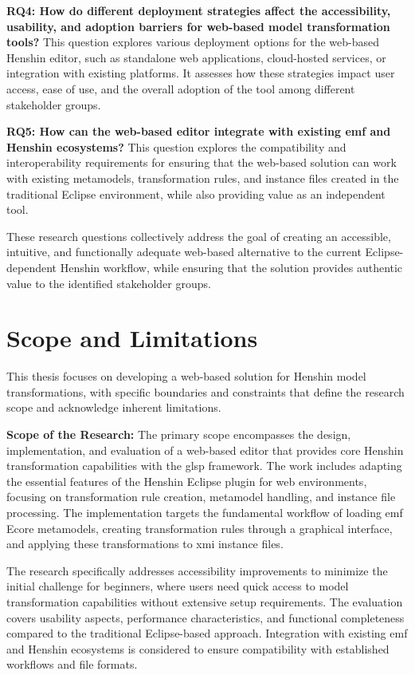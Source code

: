 \textbf{RQ4: How do different deployment strategies affect the accessibility, usability, and adoption barriers for web-based model transformation tools?}
This question explores various deployment options for the web-based Henshin editor, such as standalone web applications, cloud-hosted services, or integration with existing platforms. It assesses how these strategies impact user access, ease of use, and the overall adoption of the tool among different stakeholder groups.


\textbf{RQ5: How can the web-based editor integrate with existing \ac{emf} and Henshin ecosystems?}
This question explores the compatibility and interoperability requirements for ensuring that the web-based solution can work with existing metamodels, transformation rules, and instance files created in the traditional Eclipse environment, while also providing value as an independent tool.

These research questions collectively address the goal of creating an accessible, intuitive, and functionally adequate web-based alternative to the current Eclipse-dependent Henshin workflow, while ensuring that the solution provides authentic value to the identified stakeholder groups.

\section{Scope and Limitations}
\label{subsec:scope-limitations}

This thesis focuses on developing a web-based solution for Henshin model transformations, with specific boundaries and constraints that define the research scope and acknowledge inherent limitations.

\textbf{Scope of the Research:}
The primary scope encompasses the design, implementation, and evaluation of a web-based editor that provides core Henshin transformation capabilities with the \ac{glsp} framework. The work includes adapting the essential features of the Henshin Eclipse plugin for web environments, focusing on transformation rule creation, metamodel handling, and instance file processing. The implementation targets the fundamental workflow of loading \ac{emf} Ecore metamodels, creating transformation rules through a graphical interface, and applying these transformations to \ac{xmi} instance files.

The research specifically addresses accessibility improvements to minimize the initial challenge for beginners, where users need quick access to model transformation capabilities without extensive setup requirements. The evaluation covers usability aspects, performance characteristics, and functional completeness compared to the traditional Eclipse-based approach. Integration with existing \ac{emf} and Henshin ecosystems is considered to ensure compatibility with established workflows and file formats.

